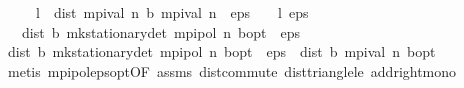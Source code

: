 \begin{isabellebody}
\ \ \ {\isachardoublequoteopen}{}\ {\isacharasterisk}{\kern0pt}\ l\ {\isacharasterisk}{\kern0pt}\ dist\ {\isacharparenleft}{\kern0pt}mpi{\isacharunderscore}{\kern0pt}val\ n{\isacharparenright}{\kern0pt}\ {\isacharparenleft}{\kern0pt}{\isasymL}\isactrlsub b\ {\isacharparenleft}{\kern0pt}mpi{\isacharunderscore}{\kern0pt}val\ n{\isacharparenright}{\kern0pt}{\isacharparenright}{\kern0pt}\ {\isacharless}{\kern0pt}\ eps\ {\isacharasterisk}{\kern0pt}\ {\isacharparenleft}{\kern0pt}{}\ {\isacharminus}{\kern0pt}\ l{\isacharparenright}{\kern0pt}{\isachardoublequoteclose}\ {\isachardoublequoteopen}eps\ {\isachargreater}{\kern0pt}\ {}{\isachardoublequoteclose}\isanewline
\ \ \ {\isachardoublequoteopen}dist\ {\isacharparenleft}{\kern0pt}{\isasymnu}\isactrlsub b\ {\isacharparenleft}{\kern0pt}mk{\isacharunderscore}{\kern0pt}stationary{\isacharunderscore}{\kern0pt}det\ {\isacharparenleft}{\kern0pt}mpi{\isacharunderscore}{\kern0pt}pol\ n{\isacharparenright}{\kern0pt}{\isacharparenright}{\kern0pt}{\isacharparenright}{\kern0pt}\ {\isacharparenleft}{\kern0pt}{\isasymnu}\isactrlsub b{\isacharunderscore}{\kern0pt}opt{\isacharparenright}{\kern0pt}\ {\isacharless}{\kern0pt}\ eps{\isachardoublequoteclose}\isanewline
%
\isadelimproof
%
\endisadelimproof
%
\isatagproof
{}\isamarkupfalse%
\ {\isacharminus}{\kern0pt}\isanewline
\ \ \isamarkupfalse%
\ {\isachardoublequoteopen}dist\ {\isacharparenleft}{\kern0pt}{\isasymnu}\isactrlsub b\ {\isacharparenleft}{\kern0pt}mk{\isacharunderscore}{\kern0pt}stationary{\isacharunderscore}{\kern0pt}det\ {\isacharparenleft}{\kern0pt}mpi{\isacharunderscore}{\kern0pt}pol\ n{\isacharparenright}{\kern0pt}{\isacharparenright}{\kern0pt}{\isacharparenright}{\kern0pt}\ {\isacharparenleft}{\kern0pt}{\isasymnu}\isactrlsub b{\isacharunderscore}{\kern0pt}opt{\isacharparenright}{\kern0pt}\ {\isasymle}\ eps{\isacharslash}{\kern0pt}{}\ {\isacharplus}{\kern0pt}\ dist\ {\isacharparenleft}{\kern0pt}{\isasymL}\isactrlsub b\ {\isacharparenleft}{\kern0pt}mpi{\isacharunderscore}{\kern0pt}val\ n{\isacharparenright}{\kern0pt}{\isacharparenright}{\kern0pt}\ {\isasymnu}\isactrlsub b{\isacharunderscore}{\kern0pt}opt{\isachardoublequoteclose}\isanewline
\ \ \ \ \isamarkupfalse%
\ {\isacharparenleft}{\kern0pt}metis\ mpi{\isacharunderscore}{\kern0pt}pol{\isacharunderscore}{\kern0pt}eps{\isacharunderscore}{\kern0pt}opt{\isacharbrackleft}{\kern0pt}OF\ assms{\isacharbrackright}{\kern0pt}\ dist{\isacharunderscore}{\kern0pt}commute\ dist{\isacharunderscore}{\kern0pt}triangle{\isacharunderscore}{\kern0pt}le\ add{\isacharunderscore}{\kern0pt}right{\isacharunderscore}{\kern0pt}mono{\isacharparenright}{\kern0pt}\isanewline

\end{isabellebody}
